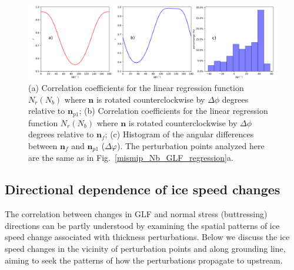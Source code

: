 \documentclass[tc, manuscript]{copernicus}
\begin{document}
\begin{figure}
\centering
\includegraphics[width=1\linewidth]{./figs/mismip_r2_all_direction.pdf}
    \caption{(a) Correlation coefficients for the linear regression function $N_r\left(N_b\right)$ where $\textbf{n}$ is rotated counterclockwise by $\Delta\phi$ degrees relative to $\mathbf{n}_{p1}$; (b) Correlation coefficients for the linear regression function $N_r\left(N_b\right)$ where $\textbf{n}$ is rotated counterclockwise by $\Delta\phi$ degrees relative to $\mathbf{n}_{f}$; (c) Histogram of the angular differences between $\mathbf{n}_{f}$ and $\mathbf{n}_{p1}$ ($\Delta\varphi$). The perturbation points analyzed here are the same as in Fig.~\ref{mismip_Nb_GLF_regression}a.}
    \label{mismip_r2_all_direction}
\end{figure}

\subsection{Directional dependence of ice speed changes}

The correlation between changes in GLF and normal stress (buttressing) directions can be partly understood by examining the spatial patterns of ice speed change associated with thickness perturbations. Below we discuss the ice speed changes in the vicinity of perturbation points and along grounding line, aiming to seek the patterns of how the perturbations propagate to upstream.  %
\end{document}
